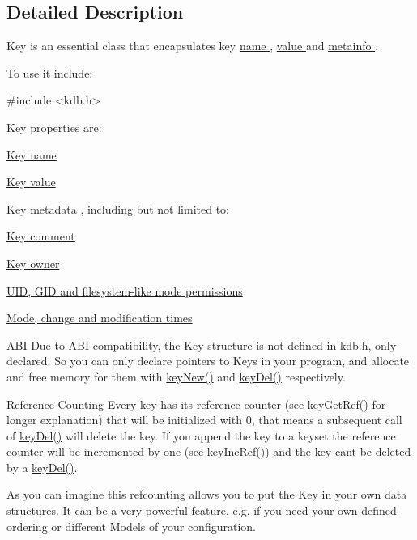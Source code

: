 \subsection{Detailed Description}
Key is an essential class that encapsulates key \hyperlink{group__keyname}{name }, \hyperlink{group__keyvalue}{value } and \hyperlink{group__keymeta}{metainfo }. 

To use it include\+: 
\begin{DoxyCode}
\textcolor{preprocessor}{#include <kdb.h>}
\end{DoxyCode}


Key properties are\+:
\begin{DoxyItemize}
\item \hyperlink{group__keyname}{Key name }
\item \hyperlink{group__keyvalue}{Key value }
\item \hyperlink{group__keymeta}{Key metadata }, including but not limited to\+:
\begin{DoxyItemize}
\item \hyperlink{group__meta_gafb89735689929ff717cc9f2d0d0b46a2}{Key comment }
\item \hyperlink{owner_8c_a35922a017bee8b4bcb493bbdfad9d6f5}{Key owner }
\item \hyperlink{group__keymeta}{U\+ID, G\+ID and filesystem-\/like mode permissions }
\item \hyperlink{group__keymeta}{Mode, change and modification times }
\end{DoxyItemize}
\end{DoxyItemize}

\begin{DoxyParagraph}{A\+BI}
Due to A\+BI compatibility, the {\ttfamily Key} structure is not defined in kdb.\+h, only declared. So you can only declare {\ttfamily pointers} to {\ttfamily Keys} in your program, and allocate and free memory for them with \hyperlink{group__key_gad23c65b44bf48d773759e1f9a4d43b89}{key\+New()} and \hyperlink{group__key_ga3df95bbc2494e3e6703ece5639be5bb1}{key\+Del()} respectively.
\end{DoxyParagraph}
\begin{DoxyParagraph}{Reference Counting}
Every key has its reference counter (see \hyperlink{group__key_ga4aabc4272506dd63161db2bbb42de8ae}{key\+Get\+Ref()} for longer explanation) that will be initialized with 0, that means a subsequent call of \hyperlink{group__key_ga3df95bbc2494e3e6703ece5639be5bb1}{key\+Del()} will delete the key. If you append the key to a keyset the reference counter will be incremented by one (see \hyperlink{group__key_ga6970a6f254d67af7e39f8e469bb162f1}{key\+Inc\+Ref()}) and the key can\textquotesingle{}t be deleted by a \hyperlink{group__key_ga3df95bbc2494e3e6703ece5639be5bb1}{key\+Del()}.
\end{DoxyParagraph}
\begin{DoxyParagraph}{}
As you can imagine this refcounting allows you to put the Key in your own data structures. It can be a very powerful feature, e.\+g. if you need your own-\/defined ordering or different Models of your configuration. 
\end{DoxyParagraph}


